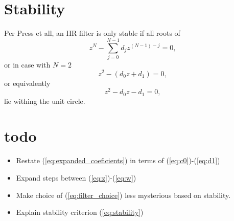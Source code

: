 \documentclass[a4paper]{article}
\begin{document}
\section{Stability}
Per Press et all, an IIR filter is only stable if all roots of
\begin{equation}
z^N - \sum^{N-1}_{j=0} d_j z^{(N-1)-j} = 0,\label{eq:stability}
\end{equation}
or in case with $N=2$
\begin{equation}
z^2 - (d_0 z + d_1) = 0,
\end{equation}
or equivalently
\begin{equation}
z^2 - d_0 z - d_1 = 0,
\end{equation}
lie withing the unit circle.

\section{todo}
\begin{itemize}
\item Restate (\ref{eq:expanded_coeficients}) in terms of (\ref{eq:c0})-(\ref{eq:d1})
\item Expand steps between (\ref{eq:z})-(\ref{eq:w})
\item Make choice of (\ref{eq:filter_choice}) less mysterious based on stability.
\item Explain stability criterion (\ref{eq:stability})
\end{itemize}
\end{document}
